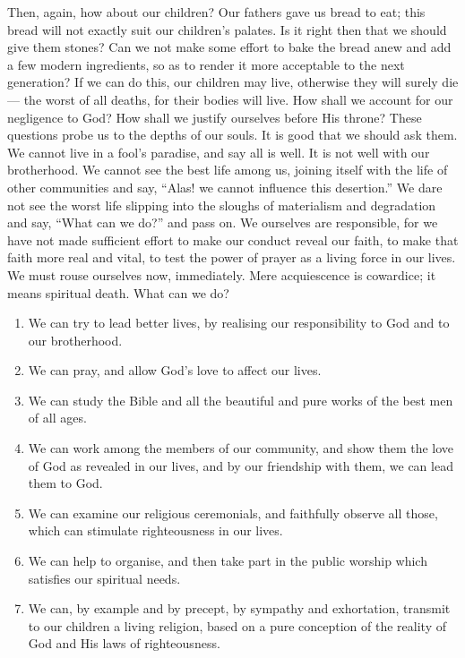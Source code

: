 Then, again, how about our children?
Our fathers gave us bread to eat; this
bread will not exactly suit our children’s
palates. Is it right then that we should
give them stones? Can we not make some
effort to bake the bread anew and add a
few modern ingredients, so as to render it
more acceptable to the next generation? If
we can do this, our children may live,
otherwise they will surely die — the worst of all
deaths, for their bodies will live. How shall
we account for our negligence to God? How
shall we justify ourselves before His throne?
These questions probe us to the depths
of our souls. It is good that we should ask
them. We cannot live in a fool’s paradise,
and say all is well. It is not well with our
brotherhood. We cannot see the best life
among us, joining itself with the life of other
communities and say, “Alas! we cannot
influence this desertion.” We dare not see
the worst life slipping into the sloughs of
materialism and degradation and say, “What
can we do?” and pass on. We ourselves
are responsible, for we have not made
sufficient effort to make our conduct reveal
our faith, to make that faith more real and
vital, to test the power of prayer as a
living force in our lives. We must rouse
ourselves now, immediately. Mere
acquiescence is cowardice; it means spiritual
death. What can we do?

\begin{enumerate}
  \item We can try to lead better lives, by
realising our responsibility to God
and to our brotherhood.

\item We can pray, and allow God’s love to
affect our lives.

\item We can study the Bible and all the
beautiful and pure works of the best
men of all ages.

\item We can work among the members of
our community, and show them the
love of God as revealed in our lives,
and by our friendship with them, we
can lead them to God.

\item We can examine our religious ceremonials,
  and faithfully observe all
those, which can stimulate righteousness
in our lives.

\item We can help to organise, and then take
part in the public worship which
satisfies our spiritual needs.

\item We can, by example and by precept, by
sympathy and exhortation, transmit
to our children a living religion,
based on a pure conception of the
reality of God and His laws of
righteousness.
\end{enumerate}

